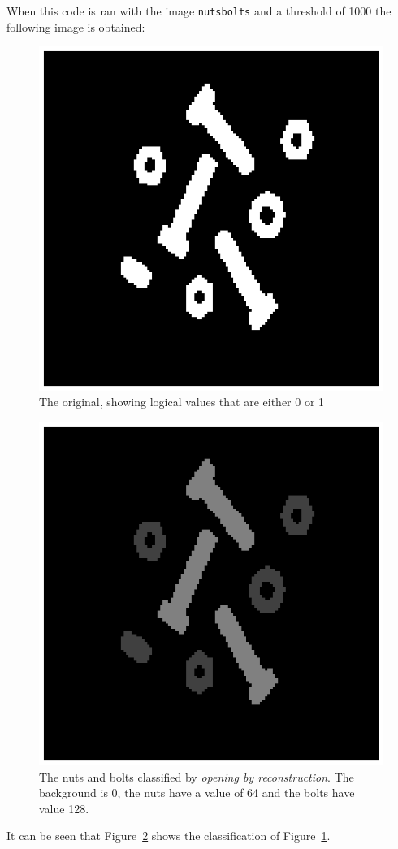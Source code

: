 \clearpage
When this code is ran with the image \texttt{nutsbolts} and a threshold of 1000 the following image is obtained:
\begin{figure}[htb]
 \centering
 \includegraphics[scale=.69]{nutsbolts.eps}
 \caption{The original, showing logical values that are either 0 or 1}
 \label{fig:nutsbolts}
\end{figure}
\begin{figure}[htb]
 \centering
 \includegraphics[scale=.69]{classification.eps}
 \caption{The nuts and bolts classified by \textit{opening by reconstruction}. The background is 0, the nuts have a value of 64 and the bolts have value 128.}
 \label{fig:classification}
\end{figure}

It can be seen that Figure~\ref{fig:classification} shows the classification of Figure~\ref{fig:nutsbolts}.
\clearpage